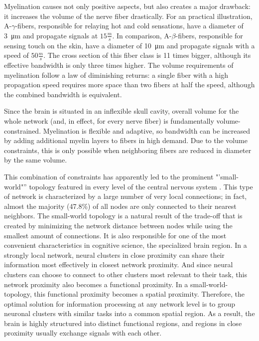 Myelination causes not only positive aspects, but also creates a major drawback: it increases the volume of the nerve fiber drastically.
For an practical illustration, A-$\gamma$-fibers, responsible for relaying hot and cold sensations, have a diameter of \SI{3}{\um} and propagate signals at $15\frac{m}{s}$.
In comparison, A-$\beta$-fibers, responsible for sensing touch on the skin, have a diameter of \SI{10}{\um} and propagate signals with a speed of $50\frac{m}{s}$.
The cross section of this fiber class is 11 times bigger, although its effective bandwidth is only three times higher.
The volume requirements of myelination follow a law of diminishing returns: a single fiber with a high propagation speed requires more space than two fibers at half the speed, although the combined bandwidth is equivalent.

Since the brain is situated in an inflexible skull cavity, overall volume for the whole network (and, in effect, for every nerve fiber) is fundamentally volume-constrained.
Myelination is flexible and adaptive, so bandwidth can be increased by adding additional myelin layers to fibers in high demand.
Due to the volume constraints, this is only possible when neighboring fibers are reduced in diameter by the same volume.

This combination of constraints has apparently led to the prominent "'small-world"'' topology featured in every level of the central nervous system \cite{1.1.smallWorld}.
This type of network is characterized by a large number of very local connections; in fact, almost the majority (47.8\%) of all nodes are only connected to their nearest neighbors.
The small-world topology is a natural result of the trade-off that is created by minimizing the network distance between nodes while using the smallest amount of connections.
It is also responsible for one of the most convenient characteristics in cognitive science, the specialized brain region.
In a strongly local network, neural clusters in close proximity can share their information most effectively in closest network proximity.
And since neural clusters can choose to connect to other clusters most relevant to their task, this network proximity also becomes a functional proximity.
In a small-world-topology, this functional proximity becomes a spatial proximity.
Therefore, the optimal solution for information processing at any network level is to group neuronal clusters with similar tasks into a common spatial region.
As a result, the brain is highly structured into distinct functional regions, and regions in close proximity usually exchange signals with each other.

